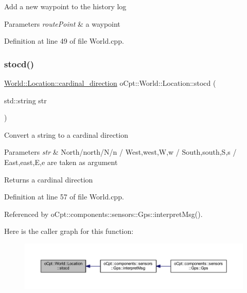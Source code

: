 Add a new waypoint to the history log 
\begin{DoxyParams}{Parameters}
{\em route\+Point} & a waypoint \\
\hline
\end{DoxyParams}


Definition at line 49 of file World.\+cpp.

\hypertarget{classo_cpt_1_1_world_1_1_location_a3ed4dcf41514af703d09b5ba17589f1e}{}\label{classo_cpt_1_1_world_1_1_location_a3ed4dcf41514af703d09b5ba17589f1e} 
\subsubsection{\texorpdfstring{stocd()}{stocd()}}
{\footnotesize\ttfamily \hyperlink{classo_cpt_1_1_world_1_1_location_aa37d99a87b49ccc38470dcc6cc64ced5}{World\+::\+Location\+::cardinal\+\_\+direction} o\+Cpt\+::\+World\+::\+Location\+::stocd (\begin{DoxyParamCaption}\item[{std\+::string}]{str }\end{DoxyParamCaption})\hspace{0.3cm}{\ttfamily [static]}}

Convert a string to a cardinal direction 
\begin{DoxyParams}{Parameters}
{\em str} & North/north/\+N/n / West,west,W,w / South,south,S,s / East,east,E,e are taken as argument \\
\hline
\end{DoxyParams}
\begin{DoxyReturn}{Returns}
a cardinal direction 
\end{DoxyReturn}


Definition at line 57 of file World.\+cpp.



Referenced by o\+Cpt\+::components\+::sensors\+::\+Gps\+::interpret\+Msg().

Here is the caller graph for this function\+:\nopagebreak
\begin{figure}[H]
\begin{center}
\leavevmode
\includegraphics[width=350pt]{classo_cpt_1_1_world_1_1_location_a3ed4dcf41514af703d09b5ba17589f1e_icgraph}
\end{center}
\end{figure}



